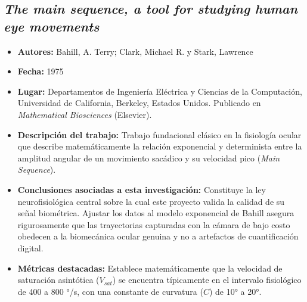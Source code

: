 \subsection{\textit{The main sequence, a tool for studying human eye movements}}
\begin{itemize}
	\item \textbf{Autores:} Bahill, A. Terry; Clark, Michael R. y Stark, Lawrence \cite{bahill1975}
	\item \textbf{Fecha:} 1975
	\item \textbf{Lugar:} Departamentos de Ingeniería Eléctrica y Ciencias de la Computación, Universidad de California, Berkeley, Estados Unidos. Publicado en \textit{Mathematical Biosciences} (Elsevier).
	\item \textbf{Descripción del trabajo:} Trabajo fundacional clásico en la fisiología ocular que describe matemáticamente la relación exponencial y determinista entre la amplitud angular de un movimiento sacádico y su velocidad pico (\textit{Main Sequence}).
	\item \textbf{Conclusiones asociadas a esta investigación:} Constituye la ley neurofisiológica central sobre la cual este proyecto valida la calidad de su señal biométrica. Ajustar los datos al modelo exponencial de Bahill asegura rigurosamente que las trayectorias capturadas con la cámara de bajo costo obedecen a la biomecánica ocular genuina y no a artefactos de cuantificación digital.
	\item \textbf{Métricas destacadas:} Establece matemáticamente que la velocidad de saturación asintótica ($V_{sat}$) se encuentra típicamente en el intervalo fisiológico de 400 a 800 °/s, con una constante de curvatura ($C$) de 10° a 20°.
\end{itemize}

